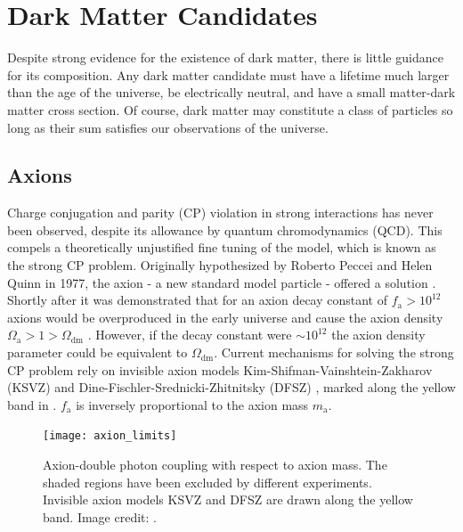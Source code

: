 
\section[Dark Matter Candidates][Dark Matter Candidates]{Dark Matter Candidates}
\label{sec:dmcandidates}
Despite strong evidence for the existence of dark matter, there is little guidance for its composition.  Any dark matter candidate must
have a lifetime much larger than the age of the universe, be electrically
neutral, and have a small matter-dark matter cross section.  Of course, dark matter may constitute a class of particles so long as their
sum satisfies our observations of the universe.



\subsection{Axions} \label{subsec:axions}
Charge conjugation and parity (CP) violation in strong interactions has never been observed, despite its allowance
by quantum chromodynamics (QCD).  This compels a theoretically unjustified fine tuning of the model, which
is known as the strong CP problem.  Originally hypothesized by Roberto Peccei and Helen Quinn in 1977, the
axion - a new standard model particle - offered a solution .  Shortly after it was
demonstrated that for an axion decay constant of $f_{\mathrm{a}} > 10^{12}$ axions would be overproduced in the
early universe and cause the axion density $\Omega_{\mathrm{a}} > 1 > \Omega_{\mathrm{dm}}$ .  However, if the
decay constant were ${\sim} 10^{12}$ the axion density parameter could be equivalent to $\Omega_{\mathrm{dm}}$.  Current mechanisms for
solving
the strong CP problem rely on invisible axion models Kim-Shifman-Vainshtein-Zakharov (KSVZ)  and
Dine-Fischler-Srednicki-Zhitnitsky
(DFSZ) , marked along the yellow band in .  $f_{\mathrm{a}}$ is inversely
proportional to the axion mass $m_{\mathrm{a}}$.

\begin{figure}
\centering
\texttt{[image: axion\_limits]}
\caption{Axion-double photon coupling with respect to axion mass.  The shaded regions have been excluded by different
experiments.  Invisible axion models KSVZ and DFSZ are drawn along the yellow band.  Image credit: .}
\label{fig:axions}
\end{figure}

